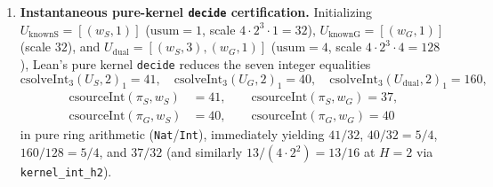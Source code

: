 \documentclass[11pt,a4paper]{article}
\begin{document}
\begin{enumerate}
  and tie-breaking order (\texttt{cselectScored\_map}).
\item
  \textbf{Instantaneous pure-kernel \texttt{decide} certification.}
  Initializing \(U_{\mathrm{knownS}} = [(w_S, 1)]\)
  (\(\mathrm{usum} = 1\), scale \(4 \cdot 2^3 \cdot 1 = 32\)),
  \(U_{\mathrm{knownG}} = [(w_G, 1)]\) (scale \(32\)), and
  \(U_{\mathrm{dual}} = [(w_S, 3), (w_G, 1)]\) (\(\mathrm{usum} = 4\),
  scale \(4 \cdot 2^3 \cdot 4 = 128\)), Lean's pure kernel
  \texttt{decide} reduces the seven integer equalities
  \[\mathrm{csolveInt}_3(U_S, 2)_1 = 41,\quad \mathrm{csolveInt}_3(U_G, 2)_1 = 40,\quad \mathrm{csolveInt}_3(U_{\mathrm{dual}}, 2)_1 = 160,\]
  \[\begin{aligned}
  \mathrm{csourceInt}(\pi_S, w_S) &= 41, \qquad \mathrm{csourceInt}(\pi_S, w_G) = 37, \\
  \mathrm{csourceInt}(\pi_G, w_S) &= 40, \qquad \mathrm{csourceInt}(\pi_G, w_G) = 40
  \end{aligned}\] in pure ring arithmetic (\texttt{Nat}/\texttt{Int}),
  immediately yielding \(41/32\), \(40/32 = 5/4\), \(160/128 = 5/4\),
  and \(37/32\) (and similarly \(13 / (4 \cdot 2^2) = 13/16\) at \(H=2\)
  via \texttt{kernel\_int\_h2}).
\end{enumerate}

\end{document}
